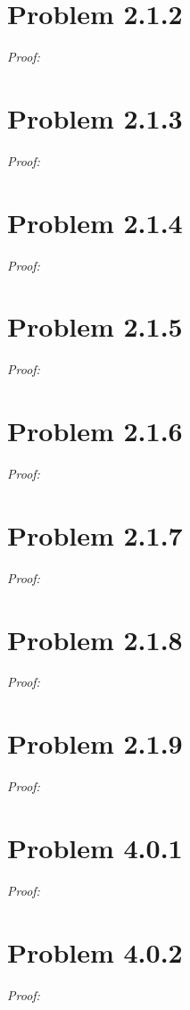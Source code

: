 \documentclass[11pt]{article}
\theoremstyle{definition}
\theoremstyle{remark}
\theoremstyle{problem}
\begin{document}
\section{Problem 2.1.2}
\textit{Proof:} 
\newpage

\section{Problem 2.1.3}
\textit{Proof:} 
\newpage

\section{Problem 2.1.4}
\textit{Proof:} 
\newpage

\section{Problem 2.1.5}
\textit{Proof:} 
\newpage

\section{Problem 2.1.6}
\textit{Proof:} 
\newpage

\section{Problem 2.1.7}
\textit{Proof:} 
\newpage

\section{Problem 2.1.8}
\textit{Proof:} 
\newpage

\section{Problem 2.1.9}
\textit{Proof:} 
\newpage

\section{Problem 4.0.1}
\textit{Proof:} 
\newpage

\section{Problem 4.0.2}
\textit{Proof:} 
\newpage
\end{document}
